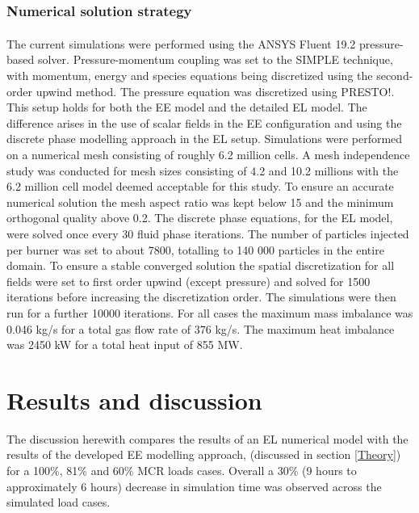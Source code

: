 \documentclass{webofc}
\begin{document}
\subsubsection{Numerical solution strategy}
The current simulations were performed using the ANSYS Fluent\textsuperscript{\textregistered} 19.2 pressure-based solver. Pressure-momentum coupling was set to the SIMPLE technique, with momentum, energy and species equations being discretized using the second-order upwind method. The pressure equation was discretized using PRESTO!. This setup holds for both the EE model and the detailed EL model. The difference arises in the use of scalar fields in the EE configuration and using the discrete phase modelling approach in the EL setup. Simulations were performed on a numerical mesh consisting of roughly 6.2 million cells. A mesh independence study was conducted for mesh sizes consisting of 4.2 and 10.2 millions with the 6.2 million cell model deemed acceptable for this study. To ensure an accurate numerical solution the mesh aspect ratio was kept below 15 and the minimum orthogonal quality above 0.2. The discrete phase equations, for the EL model, were solved once every 30 fluid phase iterations. The number of particles injected per burner was set to about 7800, totalling to 140 000 particles in the entire domain. To ensure a stable converged solution the spatial discretization for all fields were set to first order upwind (except pressure) and solved for 1500 iterations before increasing the discretization order. The simulations were then run for a further 10000 iterations. For all cases the maximum mass imbalance was 0.046 kg/s for a total gas flow rate of 376 kg/s. The maximum heat imbalance was 2450 kW for a total heat input of 855 MW.

\section{Results and discussion} \label{Results}

The discussion herewith compares the results of an EL numerical model with the results of the developed EE modelling approach, (discussed in section \ref{Theory}) for a 100\%, 81\% and 60\% MCR loads cases. Overall a 30\% (9 hours to approximately 6 hours) decrease in simulation time was observed across the simulated load cases.  \\ 
\end{document}
